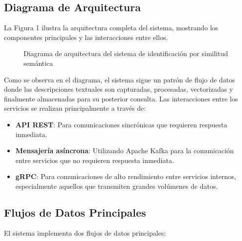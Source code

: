 \documentclass[12pt,a4paper]{article}
\begin{document}
\subsection{Diagrama de Arquitectura}
\label{subsec:diagrama-arquitectura}

La Figura 1 ilustra la arquitectura completa del sistema, mostrando los componentes principales y las interacciones entre ellos.

\begin{figure}[H]
    \centering
    \caption{Diagrama de arquitectura del sistema de identificación por similitud semántica}
    \label{fig:arquitectura}
\end{figure}

Como se observa en el diagrama, el sistema sigue un patrón de flujo de datos donde las descripciones textuales son capturadas, procesadas, vectorizadas y finalmente almacenadas para su posterior consulta. Las interacciones entre los servicios se realizan principalmente a través de:

\begin{itemize}
    \item \textbf{API REST}: Para comunicaciones sincrónicas que requieren respuesta inmediata.
    \item \textbf{Mensajería asíncrona}: Utilizando Apache Kafka para la comunicación entre servicios que no requieren respuesta inmediata.
    \item \textbf{gRPC}: Para comunicaciones de alto rendimiento entre servicios internos, especialmente aquellos que transmiten grandes volúmenes de datos.
\end{itemize}

\subsection{Flujos de Datos Principales}
\label{subsec:flujos-datos}

El sistema implementa dos flujos de datos principales:
\end{document}
